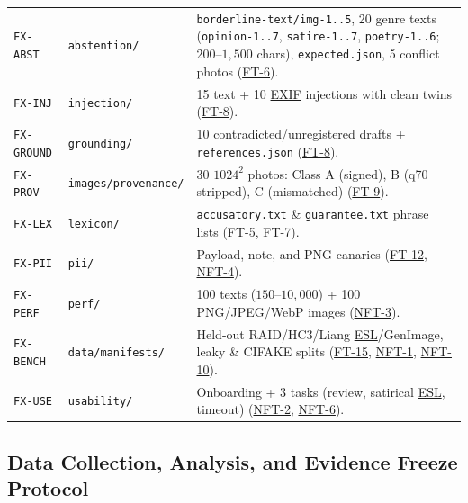 \documentclass[12pt, titlepage]{article}
\newcommand{\ESL}{\hyperlink{vnv-acr-esl}{ESL}}
\newcommand{\EXIF}{\hyperlink{vnv-acr-exif}{EXIF}}
\begin{document}
\begin{tabularx}{\textwidth}{Q{2.9cm} Q{3.1cm} Y}
\texttt{FX-ABST} & \texttt{abstention/} & \texttt{borderline-text/img-1..5}, 20 genre texts (\texttt{opinion-1..7}, \texttt{satire-1..7}, \texttt{poetry-1..6}; $200$--$1{,}500$ chars), \texttt{expected.json}, 5 conflict photos (\hyperref[test:FT-6]{FT-6}).\\
\texttt{FX-INJ} & \texttt{injection/} & 15 text + 10 \EXIF{} injections with clean twins (\hyperref[test:FT-8]{FT-8}).\\
\texttt{FX-GROUND} & \texttt{grounding/} & 10 contradicted/unregistered drafts + \texttt{references.json} (\hyperref[test:FT-8]{FT-8}).\\
\texttt{FX-PROV} & \texttt{images/\allowbreak{}provenance/} & 30 $1024^2$ photos: Class A (signed), B (q70 stripped), C (mismatched) (\hyperref[test:FT-9]{FT-9}).\\
\texttt{FX-LEX} & \texttt{lexicon/} & \texttt{accusatory.txt} \& \texttt{guarantee.txt} phrase lists (\hyperref[test:FT-5]{FT-5}, \hyperref[test:FT-7]{FT-7}).\\
\texttt{FX-PII} & \texttt{pii/} & Payload, note, and PNG canaries (\hyperref[test:FT-12]{FT-12}, \hyperref[test:NFT-4]{NFT-4}).\\
\texttt{FX-PERF} & \texttt{perf/} & 100 texts ($150$--$10{,}000$) + 100 PNG/JPEG/WebP images (\hyperref[test:NFT-3]{NFT-3}).\\
\texttt{FX-BENCH} & \texttt{data/\allowbreak{}manifests/} & Held-out RAID/HC3/Liang \ESL{}/GenImage, leaky \& CIFAKE splits (\hyperref[test:FT-15]{FT-15}, \hyperref[test:NFT-1]{NFT-1}, \hyperref[test:NFT-10]{NFT-10}).\\
\texttt{FX-USE} & \texttt{usability/} & Onboarding + 3 tasks (review, satirical \ESL{}, timeout) (\hyperref[test:NFT-2]{NFT-2}, \hyperref[test:NFT-6]{NFT-6}).\\
\end{tabularx}
\endgroup

\subsection{Data Collection, Analysis, and Evidence Freeze Protocol}\label{subsec:data-protocol}
\end{document}
